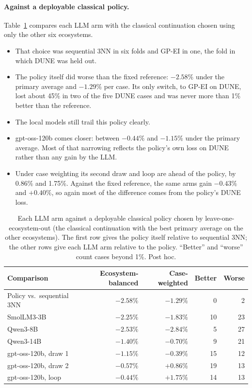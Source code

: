\paragraph{Against a deployable classical policy.} Table~\ref{tab:deployable} compares each LLM arm with the classical continuation chosen using only the other six ecosystems.
\begin{itemize}
  \item That choice was sequential 3NN in six folds and GP-EI in one, the fold in which DUNE was held out.
  \item The policy itself did worse than the fixed reference: $-2.58\%$ under the primary average and $-1.29\%$ per case. Its only switch, to GP-EI on DUNE, lost about 45\% in two of the five DUNE cases and was never more than 1\% better than the reference.
  \item The local models still trail this policy clearly.
  \item gpt-oss-120b comes closer: between $-0.44\%$ and $-1.15\%$ under the primary average. Most of that narrowing reflects the policy's own loss on DUNE rather than any gain by the LLM.
  \item Under case weighting its second draw and loop are ahead of the policy, by 0.86\% and 1.75\%. Against the fixed reference, the same arms gain $-0.43\%$ and $+0.40\%$, so again most of the difference comes from the policy's DUNE loss.
\end{itemize}

\begin{table}[t]
\centering
\caption{Each LLM arm against a deployable classical policy chosen by leave-one-ecosystem-out (the classical continuation with the best primary average on the other ecosystems). The first row gives the policy itself relative to sequential 3NN; the other rows give each LLM arm relative to the policy. ``Better'' and ``worse'' count cases beyond 1\%. Post hoc.}
\label{tab:deployable}
\small
\begin{tabular}{lrrrr}
\toprule
Comparison & Ecosystem-balanced & Case-weighted & Better & Worse \\
\midrule
Policy vs.\ sequential 3NN & $-2.58\%$ & $-1.29\%$ & 0 & 2 \\
\midrule
SmolLM3-3B & $-2.25\%$ & $-1.83\%$ & 10 & 23 \\
Qwen3-8B & $-2.53\%$ & $-2.84\%$ & 5 & 27 \\
Qwen3-14B & $-1.40\%$ & $-0.70\%$ & 9 & 21 \\
gpt-oss-120b, draw 1 & $-1.15\%$ & $-0.39\%$ & 15 & 12 \\
gpt-oss-120b, draw 2 & $-0.57\%$ & $+0.86\%$ & 19 & 13 \\
gpt-oss-120b, loop & $-0.44\%$ & $+1.75\%$ & 14 & 13 \\
\bottomrule
\end{tabular}
\end{table}

